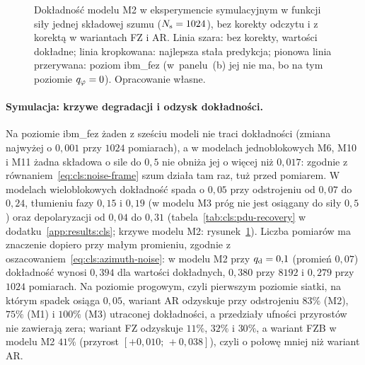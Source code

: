 \begin{figure}[tb]
\centering

\caption[Dokładność modelu M2 w funkcji siły szumu bez korekty odczytu i z korektą]{Dokładność modelu M2 w eksperymencie symulacyjnym w funkcji siły jednej składowej szumu ($N_{\mathrm{s}}=1024$), bez korekty odczytu i z korektą w wariantach FZ i AR. Linia szara: bez korekty, wartości dokładne; linia kropkowana: najlepsza stała predykcja; pionowa linia przerywana: poziom ibm\_fez (w~panelu~(b) jej nie ma, bo na tym poziomie $q_{\varphi}=0$). Opracowanie własne.}
\label{fig:cls:pdu-curves}
\end{figure}

\paragraph{Symulacja: krzywe degradacji i odzysk dokładności.}
Na poziomie ibm\_fez żaden z sześciu modeli nie traci dokładności (zmiana najwyżej o $0{,}001$ przy $1024$ pomiarach), a w modelach jednoblokowych M6, M10 i M11 żadna składowa o sile do $0{,}5$ nie obniża jej o więcej niż $0{,}017$: zgodnie z równaniem~\eqref{eq:cls:noise-frame} szum działa tam raz, tuż przed pomiarem.
W modelach wieloblokowych dokładność spada o $0{,}05$ przy odstrojeniu od $0{,}07$ do $0{,}24$, tłumieniu fazy $0{,}15$ i $0{,}19$ (w modelu M3 próg nie jest osiągany do siły $0{,}5$) oraz depolaryzacji od $0{,}04$ do $0{,}31$ (tabela~\ref{tab:cls:pdu-recovery} w dodatku~\ref{app:results:cls}; krzywe modelu M2: rysunek~\ref{fig:cls:pdu-curves}).
Liczba pomiarów ma znaczenie dopiero przy małym promieniu, zgodnie z oszacowaniem~\eqref{eq:cls:azimuth-noise}: w modelu M2 przy $q_{\mathrm{d}}=0{,}1$ (promień $0{,}07$) dokładność wynosi $0{,}394$ dla wartości dokładnych, $0{,}380$ przy $8192$ i $0{,}279$ przy $1024$ pomiarach.
Na poziomie progowym, czyli pierwszym poziomie siatki, na którym spadek osiąga $0{,}05$, wariant AR odzyskuje przy odstrojeniu $83\%$ (M2), $75\%$ (M1) i $100\%$ (M3) utraconej dokładności, a przedziały ufności przyrostów nie zawierają zera; wariant FZ odzyskuje $11\%$, $32\%$ i $30\%$, a wariant FZB w modelu M2 $41\%$ (przyrost $[+0{,}010;\,+0{,}038]$), czyli o połowę mniej niż wariant AR.
